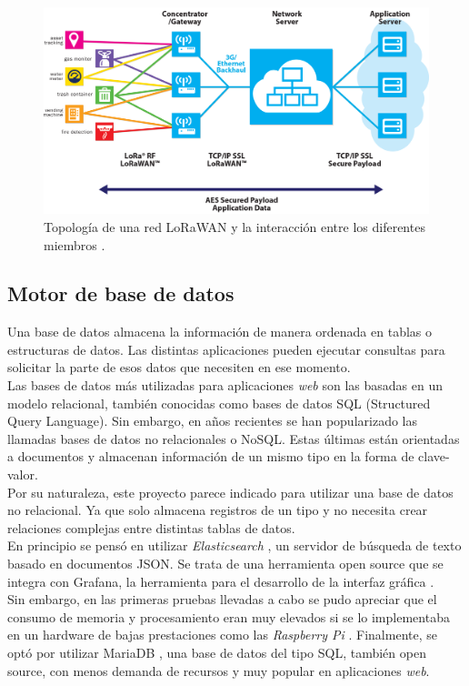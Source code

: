 \begin{figure}[h]
	\centering
	\includegraphics[width=0.9\linewidth]{Figures/sensor-gw-architecture-lora}
	\caption{Topología de una red LoRaWAN y la interacción entre los diferentes miembros \citep{lora_alliance}.}
	\label{fig:sensor-gw-architecture-lora}
\end{figure}

\subsection{Motor de base de datos}
Una base de datos almacena la información de manera ordenada en tablas o estructuras de datos. Las distintas aplicaciones pueden ejecutar consultas para solicitar la parte de esos datos que necesiten en ese momento.\\
Las bases de datos más utilizadas para aplicaciones \textit{web} son las basadas en un modelo relacional, también conocidas como bases de datos SQL (Structured Query Language). Sin embargo, en años recientes se han popularizado las llamadas bases de datos no relacionales o NoSQL. Estas últimas están orientadas a documentos y almacenan información de un mismo tipo en la forma de clave-valor.\\
Por su naturaleza, este proyecto parece indicado para utilizar una base de datos no relacional. Ya que solo almacena registros de un tipo y no necesita crear relaciones complejas entre distintas tablas de datos.\\
En principio se pensó en utilizar \textit{Elasticsearch} \citep{elasticsearch}, un servidor de búsqueda de texto basado en documentos JSON. Se trata de una herramienta open source que se integra con Grafana, la herramienta para el desarrollo de la interfaz gráfica \citep{grafana}.\\
Sin embargo, en las primeras pruebas llevadas a cabo se pudo apreciar que el consumo de memoria y procesamiento eran muy elevados si se lo implementaba en un hardware de bajas prestaciones como las \textit{Raspberry Pi} \citep{raspi}. Finalmente, se optó por utilizar MariaDB \citep{mariadb}, una base de datos del tipo SQL, también open source, con menos demanda de recursos y muy popular en aplicaciones \textit{web}.\\

